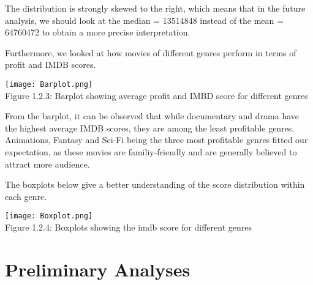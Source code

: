\documentclass[12pt]{article}
\begin{document}
\begin{multicols}{2}
The distribution is strongly skewed to the right, which means that in the future analysis, we should look at the median = 13514848 instead of the mean = 64760472 to obtain a more precise interpretation. 
\par

Furthermore, we looked at how movies of different genres perform in terms of profit and IMDB scores. \par
\begin{center}
\texttt{[image: Barplot.png]}\\
Figure 1.2.3: Barplot showing average profit and IMBD score for different genres
\end{center}
\par
From the barplot, it can be observed that while documentary and drama have the highest average IMDB scores, they are among the least profitable genres. Animations, Fantasy and Sci-Fi being the three most profitable genres fitted our expectation, as these movies are familiy-friendly and are generally believed to attract more audience. 
\par The boxplots below give a better understanding of the score distribution within each genre.
\begin{center}
\texttt{[image: Boxplot.png]}\\
Figure 1.2.4: Boxplots showing the imdb score for different genres
\end{center}
\par
\bigskip
\section{Preliminary Analyses}
\par
\bigskip

\end{multicols}
\end{document}
